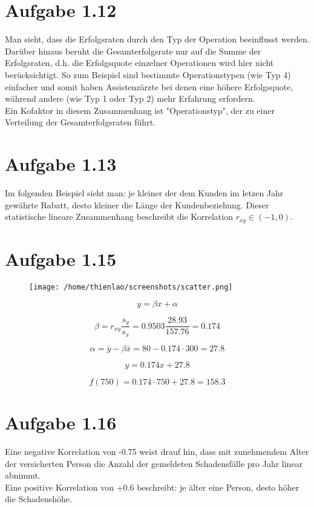 \documentclass{article}
\begin{document}
 
	
	\section*{Aufgabe 1.12}
		Man sieht, dass die Erfolgsraten durch den Typ der Operation beeinflusst werden. Darüber hinaus beruht die Gesamterfolgsrate nur auf die Summe der Erfolgsraten, d.h. die Erfolgsquote einzelner Operationen wird hier nicht berücksichtigt. So zum Beispiel sind bestimmte Operationstypen (wie Typ 4) einfacher und somit haben Assistenzärzte bei denen eine höhere Erfolgsquote, während andere (wie Typ 1 oder Typ 2) mehr Erfahrung erfordern. 
		\newline \\
		Ein Kofaktor in diesem Zusammenhang ist "Operationstyp", der zu einer Verteilung der Gesamterfolgsraten führt.
		
	\section*{Aufgabe 1.13}
		Im folgenden Beispiel sieht man: je kleiner der dem Kunden im letzen Jahr gewährte Rabatt, desto kleiner die Länge der Kundenbeziehung. Dieser statistische lineare Zusammenhang beschreibt die Korrelation \newline 
		$r_{xy} \in (-1, 0)$.
		
	\section*{Aufgabe 1.15}
		\begin{figure} [h]
			\centering
			\texttt{[image: /home/thienlao/screenshots/scatter.png]}
		\end{figure}
		
		\[y = \beta x + \alpha\]
		
		\[\beta = r_{xy} \frac{s_{y}}{s_{x}}=0.9503\frac{28.93}{157.76}=0.174\]
		
		\[\alpha=\bar{y}-\beta\bar{x}=80-0.174\cdot300=27.8\]
		
		\[y=0.174x + 27.8\]
		
		\[f(750)=0.174\cdot750 + 27.8 = 158.3\]
		\pagebreak
		
		\section*{Aufgabe 1.16}
			Eine negative Korrelation von -0.75 weist drauf hin, dass  mit zunehmendem Alter der versicherten Person die Anzahl der gemeldeten Schadensfälle pro Jahr linear abnimmt.
			\newline \\
			Eine positive Korrelation von +0.6 beschreibt: je älter eine Person, desto höher die Schadenshöhe.
			
\end{document}
